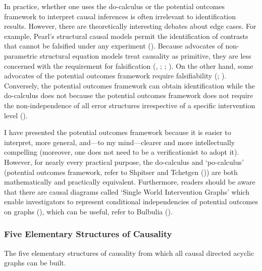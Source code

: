 \documentclass[
  single column]{article}
\begin{document}
In practice, whether one uses the do-calculus or the potential outcomes
framework to interpret causal inferences is often irrelevant to
identification results. However, there are theoretically interesting
debates about edge cases. For example, Pearl's structural causal models
permit the identification of contrasts that cannot be falsified under
any experiment (). Because advocates of non-parametric structural equation models
treat causality as primitive, they are less concerned with the
requirement for falsification (, ;
;
). On the
other hand, some advocates of the potential outcomes framework require
falsifiability (; ). Conversely, the potential outcomes framework can obtain
identification while the do-calculus does not because the potential
outcomes framework does not require the non-independence of all error
structures irrespective of a specific intervention level
().

I have presented the potential outcomes framework because it is easier
to interpret, more general, and---to my mind---clearer and more
intellectually compelling (moreover, one does not need to be a
verificationist to adopt it). However, for nearly every practical
purpose, the do-calculus and `po-calculus' (potential outcomes
framework, refer to Shpitser and Tchetgen
()) are both mathematically and
practically equivalent. Furthermore, readers should be aware that there
are causal diagrams called `Single World Intervention Graphs' which
enable investigators to represent conditional independencies of
potential outcomes on graphs
(),
which can be useful, refer to Bulbulia
().

\subsubsection{Five Elementary Structures of
Causality}\label{five-elementary-structures-of-causality}

\begin{table}

\caption{\label{tbl-fiveelementary}The five elementary structures of
causality from which all causal directed acyclic graphs can be built.}

\centering{

\terminologydirectedgraph

}

\end{table}%
\end{document}
